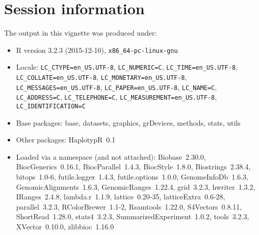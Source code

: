 \documentclass[12pt]{article}
\begin{document}
\section{Session information}
The output in this vignette was produced under:
\begin{itemize}\raggedright
  \item R version 3.2.3 (2015-12-10), \verb|x86_64-pc-linux-gnu|
  \item Locale: \verb|LC_CTYPE=en_US.UTF-8|, \verb|LC_NUMERIC=C|, \verb|LC_TIME=en_US.UTF-8|, \verb|LC_COLLATE=en_US.UTF-8|, \verb|LC_MONETARY=en_US.UTF-8|, \verb|LC_MESSAGES=en_US.UTF-8|, \verb|LC_PAPER=en_US.UTF-8|, \verb|LC_NAME=C|, \verb|LC_ADDRESS=C|, \verb|LC_TELEPHONE=C|, \verb|LC_MEASUREMENT=en_US.UTF-8|, \verb|LC_IDENTIFICATION=C|
  \item Base packages: base, datasets, graphics, grDevices, methods,
    stats, utils
  \item Other packages: HaplotypR~0.1
  \item Loaded via a namespace (and not attached): Biobase~2.30.0,
    BiocGenerics~0.16.1, BiocParallel~1.4.3, BiocStyle~1.8.0,
    Biostrings~2.38.4, bitops~1.0-6, futile.logger~1.4.3,
    futile.options~1.0.0, GenomeInfoDb~1.6.3, GenomicAlignments~1.6.3,
    GenomicRanges~1.22.4, grid~3.2.3, hwriter~1.3.2, IRanges~2.4.8,
    lambda.r~1.1.9, lattice~0.20-35, latticeExtra~0.6-28,
    parallel~3.2.3, RColorBrewer~1.1-2, Rsamtools~1.22.0,
    S4Vectors~0.8.11, ShortRead~1.28.0, stats4~3.2.3,
    SummarizedExperiment~1.0.2, tools~3.2.3, XVector~0.10.0,
    zlibbioc~1.16.0
\end{itemize}


\end{document}
